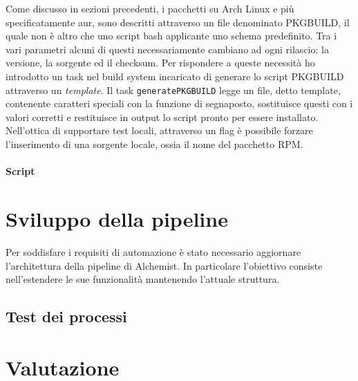 Come discusso in sezioni precedenti, i pacchetti su Arch Linux e più specificatamente \ac{aur}, sono descritti attraverso un file denominato PKGBUILD, il quale non è altro che uno script bash applicante uno schema predefinito. Tra i vari parametri alcuni di questi necessariamente cambiano ad ogni rilascio: la versione, la sorgente ed il checksum. Per rispondere a queste necessità ho introdotto un task nel build system incaricato di generare lo script PKGBUILD attraverso un \textit{template}. Il task \texttt{generatePKGBUILD} legge un file, detto template, contenente caratteri speciali con la funzione di segnaposto, sostituisce questi con i valori corretti e restituisce in output lo script pronto per essere installato. Nell'ottica di supportare test locali, attraverso un flag è possibile forzare l'inserimento di una sorgente locale, ossia il nome del pacchetto RPM.

\paragraph{Script}

\section{Sviluppo della pipeline}

Per soddisfare i requisiti di automazione è stato necessario aggiornare l'architettura della pipeline di Alchemist. In particolare l'obiettivo consiste nell'estendere le sue funzionalità mantenendo l'attuale struttura.



\subsection{Test dei processi}

\section{Valutazione}


